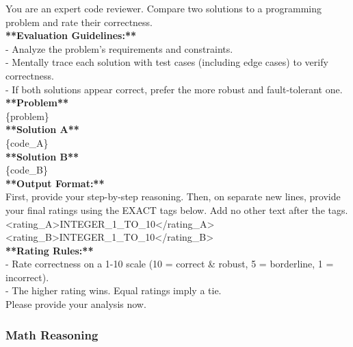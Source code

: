 \begin{tcolorbox}[
    colback=promptbg,
    colframe=promptborder,
    title={\textbf{Pairwise Code Verification Prompt}},
    coltitle=white,
    fonttitle=\small\bfseries,
    breakable,
    enhanced
]
\small
\ttfamily
You are an expert code reviewer. Compare two solutions to a programming problem and rate their correctness.\\[0.5em]
\textbf{**Evaluation Guidelines:**}\\
- Analyze the problem's requirements and constraints.\\
- Mentally trace each solution with test cases (including edge cases) to verify correctness.\\
- If both solutions appear correct, prefer the more robust and fault-tolerant one.\\[0.5em]
\textbf{**Problem**}\\
\{problem\}\\[0.5em]
\textbf{**Solution A**}\\
\{code\_A\}\\[0.5em]
\textbf{**Solution B**}\\
\{code\_B\}\\[0.5em]
\textbf{**Output Format:**}\\
First, provide your step-by-step reasoning. Then, on separate new lines, provide your final ratings using the EXACT tags below. Add no other text after the tags.\\
<rating\_A>INTEGER\_1\_TO\_10</rating\_A>\\
<rating\_B>INTEGER\_1\_TO\_10</rating\_B>\\[0.5em]
\textbf{**Rating Rules:**}\\
- Rate correctness on a 1-10 scale (10 = correct \& robust, 5 = borderline, 1 = incorrect).\\
- The higher rating wins. Equal ratings imply a tie.\\
Please provide your analysis now.
\end{tcolorbox}

\subsubsection{Math Reasoning}

